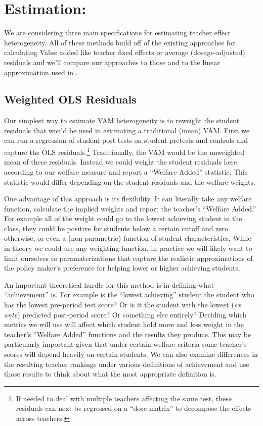 \documentclass[letterpaper,12pt]{article}
\begin{document}
\section{Estimation:}
We are considering three main specifications for estimating teacher effect heterogeneity. All of these methods build off of the existing approaches for calculating Value added like teacher fixed effects or average (dosage-adjusted) residuals and we'll compare our approaches to those and to the linear approximation used in \citet{lockwood2007sensitivity}.


\subsection{Weighted OLS Residuals}
Our simplest way to estimate VAM heterogeneity is to reweight the student residuals that would be used in estimating a traditional (mean) VAM. First we can run a regression of student post tests on student pretests and controls and capture the OLS residuals.\footnote{If needed to deal with multiple teachers affecting the same test, these residuals can next be regressed on a ``dose matrix'' to decompose the effects across teachers.} Traditionally, the VAM would be the unweighted mean of these residuals. Instead  we could weight the student residuals here according to our welfare measure and report a ``Welfare Added'' statistic. This statistic would differ depending on the student residuals and the welfare weights.

One advantage of this approach is its flexibility. It can literally take any welfare function, calculate the implied weights and report the teacher's ``Welfare Added.'' For example all of the weight could go to the lowest achieving student in the class, they could be positive for students below a certain cutoff and zero otherwise, or even a (non-parametric) function of student characteristics.  While in theory we could use any weighting function, in practice we will likely want to limit ourselves to paramaterizations that capture the realistic approximations of the policy maker's preference for helping lower or higher achieving students. 

An important theoretical hurdle for this method is in defining what ``achievement'' is. For example is the ``lowest achieving'' student the student who has the lowest pre-period test score? Or is it the student with the lowest (\textit{ex ante}) predicted post-period score? Or something else entirely? Deciding which metrics we will use will affect which student hold more and less weight in the teacher's ``Welfare Added'' functions and the results they produce. This may be particularly important given that under certain welfare criteria some teacher's scores will depend heavily on certain students. We can also examine differences in the resulting teacher rankings under various definitions of achievement and use those results to think about what the most appropriate definition is.
\end{document}
